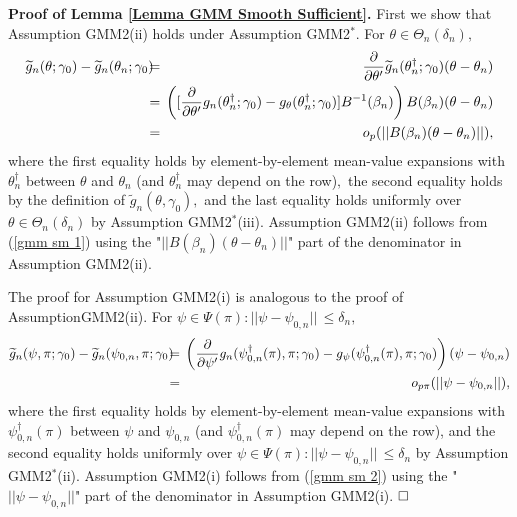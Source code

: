 \documentclass[12pt,thmsb,titlepage,final,oneside,letterpaper]{article}
\begin{document}
\noindent \textbf{Proof of Lemma \ref{Lemma GMM Smooth Sufficient}.} First
we show that Assumption GMM2(ii) holds under Assumption GMM2$^{\ast }$. For $%
\theta \in \Theta _{n}(\delta _{n}),$%
\begin{eqnarray}
\widetilde{g}_{n}(\theta ;\gamma _{0})-\widetilde{g}_{n}(\theta _{n};\gamma
_{0})\hspace{-0.08in} &=&\hspace{-0.08in}\frac{\partial }{\partial \theta
^{\prime }}\widetilde{g}_{n}(\theta _{n}^{\dag };\gamma _{0})(\theta -\theta
_{n})  \notag \\
&=&\hspace{-0.08in}\left( [\frac{\partial }{\partial \theta ^{\prime }}%
g_{n}(\theta _{n}^{\dag };\gamma _{0})-g_{\theta }(\theta _{n}^{\dag
};\gamma _{0})]B^{-1}(\beta _{n})\right) B(\beta _{n})(\theta -\theta _{n}) 
\notag \\
&=&\hspace{-0.08in}o_{p}(||B(\beta _{n})(\theta -\theta _{n})||),
\label{gmm sm 1}
\end{eqnarray}%
where the first equality holds by element-by-element mean-value expansions
with $\theta _{n}^{\dag }$ between $\theta $ and $\theta _{n}$ (and $\theta
_{n}^{\dag }$ may depend on the row)$,$ the second equality holds by the
definition of $\widetilde{g}_{n}(\theta ,\gamma _{0}),$ and the last
equality holds uniformly over $\theta \in \Theta _{n}(\delta _{n})$ by
Assumption GMM2$^{\ast }$(iii). Assumption GMM2(ii) follows from (\ref{gmm
sm 1}) using the "$||B(\beta _{n})(\theta -\theta _{n})||$" part of the
denominator in Assumption GMM2(ii).

The proof for Assumption GMM2(i) is analogous to the proof of
Assumption\linebreak GMM2(ii). For $\psi \in \Psi (\pi ):||\psi -\psi
_{0,n}||\,\leq \delta _{n},$%
\begin{eqnarray}
\widetilde{g}_{n}(\psi ,\pi ;\gamma _{0})-\widetilde{g}_{n}(\psi _{0,n},\pi
;\gamma _{0})\hspace{-0.08in} &=&\hspace{-0.08in}\left( \frac{\partial }{%
\partial \psi ^{\prime }}g_{n}(\psi _{0,n}^{\dag }(\pi ),\pi ;\gamma
_{0})-g_{\psi }(\psi _{0,n}^{\dag }(\pi ),\pi ;\gamma _{0})\right) (\psi
-\psi _{0,n})  \notag \\
&=&\hspace{-0.08in}o_{p\pi }(||\psi -\psi _{0,n}||),  \label{gmm sm 2}
\end{eqnarray}%
where the first equality holds by element-by-element mean-value expansions
with $\psi _{0,n}^{\dag }(\pi )$ between $\psi $ and $\psi _{0,n}$ (and $%
\psi _{0,n}^{\dag }(\pi )$ may depend on the row), and the second equality
holds uniformly over $\psi \in \Psi (\pi ):||\psi -\psi _{0,n}||\,\leq
\delta _{n}$ by Assumption GMM2$^{\ast }$(ii). Assumption GMM2(i) follows
from (\ref{gmm sm 2}) using the "$||\psi -\psi _{0,n}||$" part of the
denominator in Assumption GMM2(i). $\square \bigskip $
\end{document}
